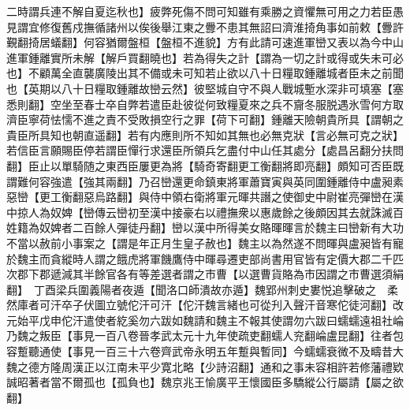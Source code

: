 二時謂兵連不解自夏迄秋也】疲弊死傷不問可知雖有乘勝之資懼無可用之力若臣愚見謂宜修復舊戍撫循諸州以俟後舉江東之釁不患其無詔曰濟淮掎角事如前敕【釁許覲翻掎居蟻翻】何容猶爾盤桓【盤桓不進貌】方有此請可速進軍巒又表以為今中山進軍鍾離實所未解【解戶買翻曉也】若為得失之計【謂為一切之計或得或失未可必也】不顧萬全直襲廣陵出其不備或未可知若止欲以八十日糧取鍾離城者臣未之前聞也【英期以八十日糧取鍾離故巒云然】彼堅城自守不與人戰城塹水深非可填塞【塞悉則翻】空坐至春士卒自弊若遣臣赴彼從何致糧夏來之兵不齎冬服脱遇氷雪何方取濟臣寧荷怯懦不進之責不受敗損空行之罪【荷下可翻】鍾離天險朝貴所具【謂朝之貴臣所具知也朝直遥翻】若有内應則所不知如其無也必無克狀【言必無可克之狀】若信臣言願賜臣停若謂臣憚行求還臣所領兵乞盡付中山任其處分【處昌呂翻分扶問翻】臣止以單騎随之東西臣屢更為將【騎奇寄翻更工衡翻將即亮翻】頗知可否臣既謂難何容強遣【強其兩翻】乃召巒還更命鎮東將軍蕭寶寅與英同圍鍾離侍中盧昶素惡巒【更工衡翻惡烏路翻】與侍中領右衛將軍元暉共譖之使御史中尉崔亮彈巒在漢中掠人為奴婢【巒傳云巒初至漢中接豪右以禮撫衆以惠歲餘之後頗因其去就誅滅百姓籍為奴婢者二百餘人彈徒丹翻】巒以漢中所得美女賂暉暉言於魏主曰巒新有大功不當以赦前小事案之【謂是年正月生皇子赦也】魏主以為然遂不問暉與盧昶皆有寵於魏主而貪縱時人謂之餓虎將軍饑鷹侍中暉尋遷吏部尚書用官皆有定價大郡二千匹次郡下郡遞減其半餘官各有等差選者謂之市曹【以選曹貨賂為市因謂之市曹選須絹翻】　丁酉梁兵圍義陽者夜遁【聞洛口師潰故亦遁】魏郢州刺史婁悦追擊破之　柔然庫者可汗卒子伏圖立號佗汗可汗【佗汗魏言緒也可從刋入聲汗音寒佗徒河翻】改元始平戊申佗汗遣使者紇奚勿六跋如魏請和魏主不報其使謂勿六跋曰蠕蠕遠祖社崘乃魏之叛臣【事見一百八卷晉孝武太元十九年使疏吏翻蠕人兖翻崘盧昆翻】往者包容蹔聽通使【事見一百三十六卷齊武帝永明五年蹔與暫同】今蠕蠕衰微不及疇昔大魏之德方隆周漢正以江南未平少寛北略【少詩沼翻】通和之事未容相許若修藩禮欵誠昭著者當不爾孤也【孤負也】魏京兆王愉廣平王懷國臣多驕縱公行屬請【屬之欲翻】

